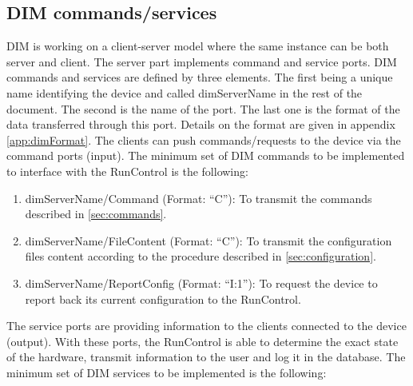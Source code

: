 \documentclass[a4paper]{article}
\begin{document}
\subsection{DIM commands/services} \label{sec:DIM}
DIM is working on a client-server model where the same instance can be both server and client.
The server part implements command and service ports. DIM commands and
services are defined by three elements. The first being a unique name
identifying the device and called dimServerName in the rest of the document.
The second is the name of the port. The last one is the format of the data
transferred through this port. Details on the format are given in appendix
\ref{app:dimFormat}. The clients can push commands/requests to the device via
the command ports (input). The minimum set of DIM commands to be implemented to
interface with the RunControl is the following:
\begin{enumerate}[label=\textbf{CMD.\arabic*}]
	\item \label{cmd:command} dimServerName/Command (Format: ``C''): To transmit
	the commands described in \ref{sec:commands}.
	\item \label{cmd:fileContent} dimServerName/FileContent (Format: ``C''): To
	transmit the configuration files content according to the procedure described
	in \ref{sec:configuration}.
	\item \label{cmd:report} dimServerName/ReportConfig (Format: ``I:1''): To request the device to
	report back its current configuration to the RunControl.
\end{enumerate}
The service ports are providing information to the clients connected to the device (output).
With these ports, the RunControl is able to determine the exact state of the hardware,
transmit information to the user and log it in the database. The minimum set of DIM services to
be implemented is the following:
\end{document}
